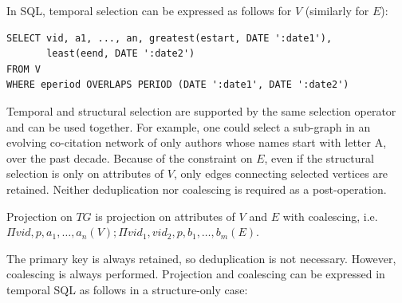 In SQL, temporal selection can be expressed as follows for $V$
(similarly for $E$):

\begin{small}
\begin{verbatim}
SELECT vid, a1, ..., an, greatest(estart, DATE ':date1'), 
       least(eend, DATE ':date2')
FROM V
WHERE eperiod OVERLAPS PERIOD (DATE ':date1', DATE ':date2')
\end{verbatim}
\end{small}

Temporal and structural selection are supported by the same selection
operator and can be used together.  For example, one could select a
sub-graph in an evolving co-citation network of only authors whose
names start with letter A, over the past decade.  Because of the
constraint on $E$, even if the structural selection is only on
attributes of $V$, only edges connecting selected vertices are
retained.  Neither deduplication nor coalescing is required as a
post-operation.

\begin{definition}[Projection]
Projection on $TG$ is projection on attributes of $V$ and $E$ with
coalescing, i.e. \\$\Pi vid, p, a_1, \ldots, a_n(V); \Pi vid_1, vid_2,
p, b_1, \ldots, b_m(E)$. 
\label{def:projection}
\end{definition}

The primary key is always retained, so deduplication is not necessary.
However, coalescing is always performed.  Projection and coalescing
can be expressed in temporal SQL as follows in a structure-only case:


